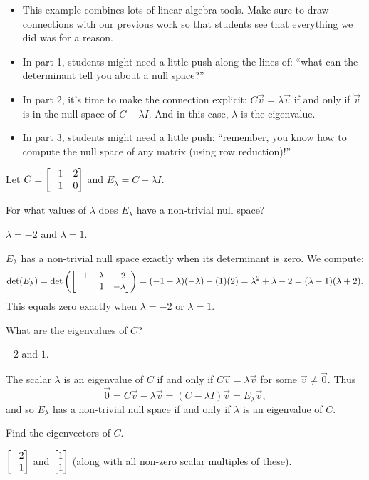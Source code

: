 \documentclass{workbook}
\begin{document}
\begin{slide}
\begin{annotation}
		\begin{notes}
			\begin{itemize}
				\item This example combines lots of linear algebra tools. Make sure to draw
					connections with our previous work so that students see that
					everything we did was for a reason.
				\item In part 1, students might need a little push along the lines of:
					``what can the determinant tell you about a null space?''
				\item In part 2, it's time to make the connection explicit: $C\vec v=\lambda \vec v$
					if and only if $\vec v$ is in the null space of $C-\lambda I$. And in this case,
					$\lambda$ is the eigenvalue.
				\item In part 3, students might need a little push: ``remember, you know how
					to compute the null space of any matrix (using row reduction)!''
			\end{itemize}
		\end{notes}
	\end{annotation}
	Let $C=\mat{-1&2\\1&0}$ and $E_\lambda = C-\lambda I$.
	\begin{parts}
		\item For what values of $\lambda$ does $E_\lambda$ have a non-trivial
			null space?
			\begin{solution}
				$\lambda=-2$ and $\lambda=1$.

				$E_\lambda$ has a non-trivial null space exactly when its
				determinant is zero. We compute:
				\[
					\det(E_\lambda)
					=\det\left(\mat{-1-\lambda&2\\1&-\lambda}\right)
					=(-1-\lambda)(-\lambda)-(1)(2)
					=\lambda^2+\lambda-2
					=(\lambda-1)(\lambda+2).
				\]
				This equals zero exactly when $\lambda=-2$ or $\lambda=1$.
			\end{solution}
		\item What are the eigenvalues of $C$?
			\begin{solution}
				$-2$ and $1$.

				The scalar $\lambda$ is an eigenvalue of $C$ if and only if $C\vec v=\lambda \vec v$ for
				some $\vec v\neq \vec 0$. Thus
				\[
					\vec 0=C\vec v-\lambda \vec v=(C-\lambda I)\vec v=E_\lambda \vec v,
				\]
				and so $E_{\lambda}$ has a non-trivial null space if and only if $\lambda$ is
				an eigenvalue of $C$.
			\end{solution}
		\item Find the eigenvectors of $C$.
			\begin{solution}
				$\mat{-2\\1}$ and $\mat{1\\1}$ (along with all non-zero scalar
				multiples of these).


\end{solution}
\end{parts}
\end{slide}
\end{document}
